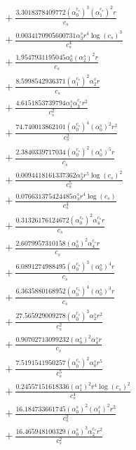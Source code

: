 \documentclass[10pt]{article}
\begin{document}
\begin{align*}
&{}  + \frac{3.3018378409772 \left(\alpha_{0}^{c_s}\right)^{3} \left(\alpha_{1}^{c_s}\right)^{2} r}{c_{s}} \\
&{}  + \frac{0.0034170905600731 \alpha_{3}^s r^{4} \log{\left(c_{s} \right)}^{3}}{c_{s}^{4}} \\
&{}  + \frac{1.9547931195045 \alpha_{0}^s \left(\alpha_{2}^s\right)^{2} r}{c_{s}} \\
&{}  + \frac{8.5998542936371 \left(\alpha_{1}^{c_s}\right)^{2} \alpha_{2}^s r}{c_{s}} \\
&{}  + \frac{4.6151853739794 \alpha_{1}^s \alpha_{3}^{c_s} r^{2}}{c_{s}^{2}} \\
&{}  + \frac{74.740013862101 \left(\alpha_{0}^{c_s}\right)^{4} \left(\alpha_{0}^s\right)^{2} r^{2}}{c_{s}^{2}} \\
&{}  + \frac{2.3840339717034 \left(\alpha_{0}^{c_s}\right)^{2} \left(\alpha_{0}^s\right)^{5} r}{c_{s}} \\
&{}  + \frac{0.0094418161337362 \alpha_{2}^s r^{5} \log{\left(c_{s} \right)}^{2}}{c_{s}^{5}} \\
&{}  + \frac{0.076631375424485 \alpha_{3}^s r^{4} \log{\left(c_{s} \right)}}{c_{s}^{4}} \\
&{}  + \frac{0.31326176124672 \left(\alpha_{0}^{c_s}\right)^{2} \alpha_{4}^{c_s} r}{c_{s}} \\
&{}  + \frac{2.6079957310158 \left(\alpha_{0}^s\right)^{2} \alpha_{4}^{c_s} r}{c_{s}} \\
&{}  + \frac{6.0891274988495 \left(\alpha_{0}^{c_s}\right)^{3} \left(\alpha_{0}^s\right)^{4} r}{c_{s}} \\
&{}  + \frac{6.3635880168952 \left(\alpha_{0}^{c_s}\right)^{4} \left(\alpha_{0}^s\right)^{3} r}{c_{s}} \\
&{}  + \frac{27.565929009278 \left(\alpha_{0}^{c_s}\right)^{3} \alpha_{2}^s r^{2}}{c_{s}^{2}} \\
&{}  + \frac{0.90702713099232 \left(\alpha_{0}^s\right)^{2} \alpha_{4}^s r}{c_{s}} \\
&{}  + \frac{7.5191541950257 \left(\alpha_{0}^{c_s}\right)^{2} \alpha_{0}^s r^{5}}{c_{s}^{5}} \\
&{}  + \frac{0.24557151618336 \left(\alpha_{1}^s\right)^{2} r^{4} \log{\left(c_{s} \right)}^{2}}{c_{s}^{4}} \\
&{}  + \frac{16.184733661745 \left(\alpha_{0}^s\right)^{2} \left(\alpha_{1}^s\right)^{2} r^{2}}{c_{s}^{2}} \\
&{}  + \frac{16.465948100329 \left(\alpha_{0}^s\right)^{3} \alpha_{2}^{c_s} r^{2}}{c_{s}^{2}} \\

\end{align*}
\end{document}
